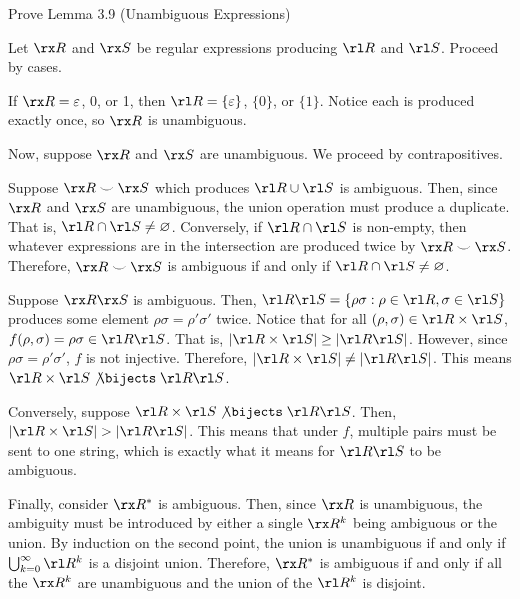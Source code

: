 \documentclass[class=math239,notes,tikz]{agony}
\begin{document}
\begin{xca}
  Prove Lemma 3.9 (Unambiguous Expressions)
\end{xca}
\begin{prf}
  Let $\rx R$ and $\rx S$ be regular expressions producing $\rl R$ and $\rl S$.
  Proceed by cases.

  If $\rx R = \varepsilon$, 0, or 1, then $\rl R = \{\varepsilon\}$, $\{0\}$, or $\{1\}$.
  Notice each is produced exactly once, so $\rx R$ is unambiguous.

  Now, suppose $\rx R$ and $\rx S$ are unambiguous.
  We proceed by contrapositives.

  Suppose $\rx R \smile \rx S$ which produces $\rl R \cup \rl S$ is ambiguous.
  Then, since $\rx R$ and $\rx S$ are unambiguous,
  the union operation must produce a duplicate.
  That is, $\rl R \cap \rl S \neq \varnothing$.
  Conversely, if $\rl R \cap \rl S$ is non-empty,
  then whatever expressions are in the intersection are produced twice by $\rx R \smile \rx S$.
  Therefore, $\rx R \smile \rx S$ is ambiguous if and only if $\rl R \cap \rl S \neq \varnothing$.

  Suppose $\rx R\rx S$ is ambiguous.
  Then, $\rl R \rl S = \{\rho\sigma : \rho \in \rl R, \sigma \in \rl S\}$
  produces some element $\rho\sigma = \rho'\sigma'$ twice.
  Notice that for all $(\rho,\sigma) \in \rl R \times \rl S$, $f(\rho,\sigma) = \rho\sigma \in \rl R \rl S$.
  That is, $\abs{\rl R \times \rl S} \geq \abs{\rl R \rl S}$.
  However, since $\rho\sigma = \rho'\sigma'$, $f$ is not injective.
  Therefore, $\abs{\rl R \times \rl S} \neq \abs{\rl R \rl S}$.
  This means $\rl R\times\rl S \mathrel{\not\bijects} \rl R\rl S$.

  Conversely, suppose $\rl R\times\rl S \mathrel{\not\bijects} \rl R\rl S$.
  Then, $\abs{\rl R \times \rl S} > \abs{\rl R \rl S}$.
  This means that under $f$, multiple pairs must be sent to one string,
  which is exactly what it means for $\rl R\rl S$ to be ambiguous.

  Finally, consider $\rx R^*$ is ambiguous.
  Then, since $\rx R$ is unambiguous, the ambiguity must be introduced
  by either a single $\rx R^k$ being ambiguous or the union.
  By induction on the second point, the union is unambiguous if and only if
  $\bigcup_{k=0}^\infty \rl R^k$ is a disjoint union.
  Therefore, $\rx R^*$ is ambiguous if and only if all the $\rx R^k$ are unambiguous
  and the union of the $\rl R^k$ is disjoint.
\end{prf}
\end{document}
